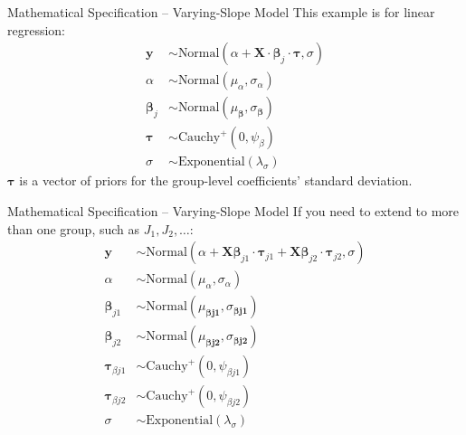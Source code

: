 \begin{frame}{Mathematical Specification -- Varying-Slope Model}
	This example is for linear regression:
	$$
		\begin{aligned}
			\mathbf{y}           & \sim \text{Normal}\left( \alpha + \mathbf{X} \cdot \boldsymbol{\beta}_j \cdot \boldsymbol{\tau}, \sigma \right) \\
			\alpha               & \sim \text{Normal}(\mu_\alpha, \sigma_\alpha)                                                                   \\
			\boldsymbol{\beta}_j & \sim \text{Normal}(\mu_{\boldsymbol{\beta}}, \sigma_{\boldsymbol{\beta}})                                       \\
			\boldsymbol{\tau}    & \sim \text{Cauchy}^+(0, \psi_{\beta})                                                                           \\
			\sigma               & \sim \text{Exponential}(\lambda_\sigma)
		\end{aligned}
	$$
	$\boldsymbol{\tau}$ is a vector of priors for the group-level coefficients'
	standard deviation.
\end{frame}

\begin{frame}{Mathematical Specification -- Varying-Slope Model}
	If you need to extend to more than one group,
	such as $J_1, J_2, \dots$:
	$$
		\begin{aligned}
			\mathbf{y}                   & \sim \text{Normal}(\alpha + \mathbf{X} \boldsymbol{\beta}_{j1} \cdot \boldsymbol{\tau}_{j1} + \mathbf{X} \boldsymbol{\beta}_{j2} \cdot \boldsymbol{\tau}_{j2}, \sigma) \\
			\alpha                       & \sim \text{Normal}(\mu_\alpha, \sigma_\alpha)                                                                                                                          \\
			\boldsymbol{\beta}_{j1}      & \sim \text{Normal}(\mu_{\boldsymbol{\beta j1}}, \sigma_{\boldsymbol{\beta j1}})                                                                                        \\
			\boldsymbol{\beta}_{j2}      & \sim \text{Normal}(\mu_{\boldsymbol{\beta j2}}, \sigma_{\boldsymbol{\beta j2}})                                                                                        \\
			\boldsymbol{\tau}_{\beta j1} & \sim \text{Cauchy}^+(0, \psi_{\beta j1})                                                                                                                               \\
			\boldsymbol{\tau}_{\beta j2} & \sim \text{Cauchy}^+(0, \psi_{\beta j2})                                                                                                                               \\
			\sigma                       & \sim \text{Exponential}(\lambda_\sigma)
		\end{aligned}
	$$
\end{frame}


